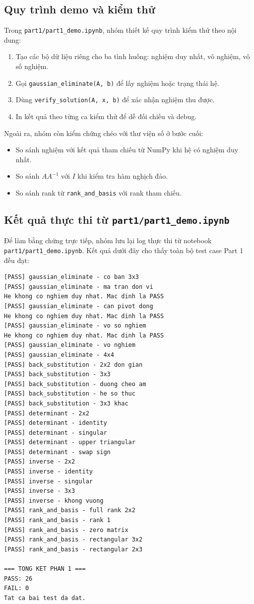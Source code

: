 \documentclass[a4paper]{article}
\begin{document}
\subsection{Quy trình demo và kiểm thử}

Trong \texttt{part1/part1\_demo.ipynb}, nhóm thiết kế quy trình kiểm thử theo nội dung:
\begin{enumerate}
    \item Tạo các bộ dữ liệu riêng cho ba tình huống: nghiệm duy nhất, vô nghiệm, vô số nghiệm.
    \item Gọi \texttt{gaussian\_eliminate(A, b)} để lấy nghiệm hoặc trạng thái hệ.
    \item Dùng \texttt{verify\_solution(A, x, b)} để xác nhận nghiệm thu được.
    \item In kết quả theo từng ca kiểm thử để dễ đối chiếu và debug.
\end{enumerate}

Ngoài ra, nhóm còn kiểm chứng chéo với thư viện số ở bước cuối:
\begin{itemize}
    \item So sánh nghiệm với kết quả tham chiếu từ NumPy khi hệ có nghiệm duy nhất.
    \item So sánh \(AA^{-1}\) với \(I\) khi kiểm tra hàm nghịch đảo.
    \item So sánh rank từ \texttt{rank\_and\_basis} với rank tham chiếu.
\end{itemize}


\subsection{Kết quả thực thi từ \texttt{part1/part1\_demo.ipynb}}

Để làm bằng chứng trực tiếp, nhóm lưu lại log thực thi từ notebook \texttt{part1/part1\_demo.ipynb}. Kết quả dưới đây cho thấy toàn bộ test case Part 1 đều đạt:

\begin{verbatim}
[PASS] gaussian_eliminate - co ban 3x3
[PASS] gaussian_eliminate - ma tran don vi
He khong co nghiem duy nhat. Mac dinh la PASS
[PASS] gaussian_eliminate - can pivot dong
He khong co nghiem duy nhat. Mac dinh la PASS
[PASS] gaussian_eliminate - vo so nghiem
He khong co nghiem duy nhat. Mac dinh la PASS
[PASS] gaussian_eliminate - vo nghiem
[PASS] gaussian_eliminate - 4x4
[PASS] back_substitution - 2x2 don gian
[PASS] back_substitution - 3x3
[PASS] back_substitution - duong cheo am
[PASS] back_substitution - he so thuc
[PASS] back_substitution - 3x3 khac
[PASS] determinant - 2x2
[PASS] determinant - identity
[PASS] determinant - singular
[PASS] determinant - upper triangular
[PASS] determinant - swap sign
[PASS] inverse - 2x2
[PASS] inverse - identity
[PASS] inverse - singular
[PASS] inverse - 3x3
[PASS] inverse - khong vuong
[PASS] rank_and_basis - full rank 2x2
[PASS] rank_and_basis - rank 1
[PASS] rank_and_basis - zero matrix
[PASS] rank_and_basis - rectangular 3x2
[PASS] rank_and_basis - rectangular 2x3

=== TONG KET PHAN 1 ===
PASS: 26
FAIL: 0
Tat ca bai test da dat.
\end{verbatim}
\end{document}
